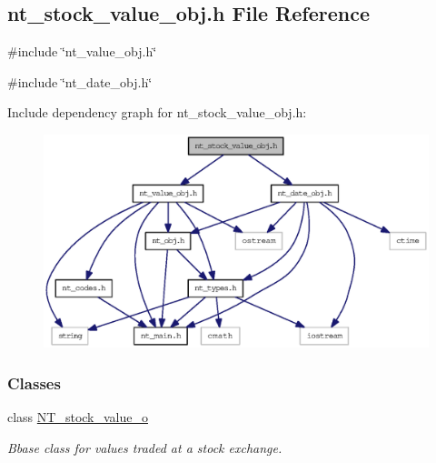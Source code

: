 \subsection{nt\_\-stock\_\-value\_\-obj.h File Reference}
\label{nt__stock__value__obj_8h}
{\ttfamily \#include \char`\"{}nt\_\-value\_\-obj.h\char`\"{}}\par
{\ttfamily \#include \char`\"{}nt\_\-date\_\-obj.h\char`\"{}}\par
Include dependency graph for nt\_\-stock\_\-value\_\-obj.h:
\nopagebreak
\begin{figure}[H]
\begin{center}
\leavevmode
\includegraphics[width=400pt]{nt__stock__value__obj_8h__incl}
\end{center}
\end{figure}
\subsubsection*{Classes}
\begin{DoxyCompactItemize}
\item 
class \hyperlink{class_n_t__stock__value__o}{NT\_\-stock\_\-value\_\-o}
\begin{DoxyCompactList}\small\item\em Bbase class for values traded at a stock exchange. \item\end{DoxyCompactList}\end{DoxyCompactItemize}
